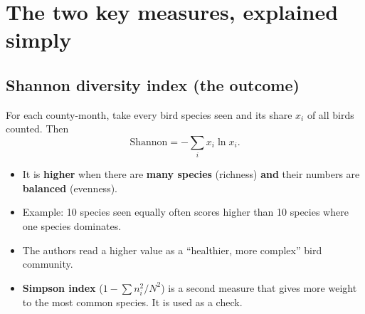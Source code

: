 \documentclass[11pt]{article}
\begin{document}
\section{The two key measures, explained simply}

\subsection{Shannon diversity index (the outcome)}
For each county-month, take every bird species seen and its share $x_i$ of all birds counted. Then
\[
\text{Shannon} = -\sum_i x_i \ln x_i .
\]
\begin{itemize}
\item It is \textbf{higher} when there are \textbf{many species} (richness) \textbf{and} their numbers are \textbf{balanced} (evenness).
\item Example: 10 species seen equally often scores higher than 10 species where one species dominates.
\item The authors read a higher value as a ``healthier, more complex'' bird community.
\item \textbf{Simpson index} ($1-\sum n_i^2/N^2$) is a second measure that gives more weight to the most common species. It is used as a check.
\end{itemize}
\end{document}
